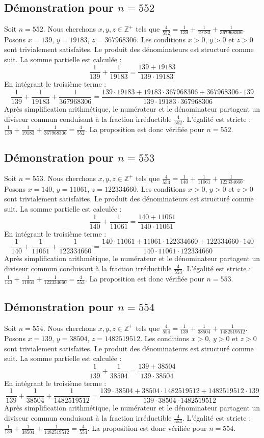 \documentclass[11pt,a4paper]{article}
\begin{document}
\subsection{Démonstration pour $n = 552$}
Soit $n = 552$. Nous cherchons $x, y, z \in \mathbb{Z}^{+}$ tels que $\frac{4}{552} = \frac{1}{139} + \frac{1}{19183} + \frac{1}{367968306}$.
Posons $x = 139$, $y = 19183$, $z = 367968306$.
Les conditions $x > 0$, $y > 0$ et $z > 0$ sont trivialement satisfaites.
Le produit des dénominateurs est structuré comme suit. La somme partielle est calculée :
$$ \frac{1}{139} + \frac{1}{19183} = \frac{139+19183}{139 \cdot 19183} $$
En intégrant le troisième terme :
$$ \frac{1}{139} + \frac{1}{19183} + \frac{1}{367968306} = \frac{139 \cdot 19183 + 19183 \cdot 367968306 + 367968306 \cdot 139}{139 \cdot 19183 \cdot 367968306} $$
Après simplification arithmétique, le numérateur et le dénominateur partagent un diviseur commun conduisant à la fraction irréductible $\frac{4}{552}$.
L'égalité est stricte : $\frac{1}{139} + \frac{1}{19183} + \frac{1}{367968306} = \frac{4}{552}$.
La proposition est donc vérifiée pour $n = 552$.
\subsection{Démonstration pour $n = 553$}
Soit $n = 553$. Nous cherchons $x, y, z \in \mathbb{Z}^{+}$ tels que $\frac{4}{553} = \frac{1}{140} + \frac{1}{11061} + \frac{1}{122334660}$.
Posons $x = 140$, $y = 11061$, $z = 122334660$.
Les conditions $x > 0$, $y > 0$ et $z > 0$ sont trivialement satisfaites.
Le produit des dénominateurs est structuré comme suit. La somme partielle est calculée :
$$ \frac{1}{140} + \frac{1}{11061} = \frac{140+11061}{140 \cdot 11061} $$
En intégrant le troisième terme :
$$ \frac{1}{140} + \frac{1}{11061} + \frac{1}{122334660} = \frac{140 \cdot 11061 + 11061 \cdot 122334660 + 122334660 \cdot 140}{140 \cdot 11061 \cdot 122334660} $$
Après simplification arithmétique, le numérateur et le dénominateur partagent un diviseur commun conduisant à la fraction irréductible $\frac{4}{553}$.
L'égalité est stricte : $\frac{1}{140} + \frac{1}{11061} + \frac{1}{122334660} = \frac{4}{553}$.
La proposition est donc vérifiée pour $n = 553$.
\subsection{Démonstration pour $n = 554$}
Soit $n = 554$. Nous cherchons $x, y, z \in \mathbb{Z}^{+}$ tels que $\frac{4}{554} = \frac{1}{139} + \frac{1}{38504} + \frac{1}{1482519512}$.
Posons $x = 139$, $y = 38504$, $z = 1482519512$.
Les conditions $x > 0$, $y > 0$ et $z > 0$ sont trivialement satisfaites.
Le produit des dénominateurs est structuré comme suit. La somme partielle est calculée :
$$ \frac{1}{139} + \frac{1}{38504} = \frac{139+38504}{139 \cdot 38504} $$
En intégrant le troisième terme :
$$ \frac{1}{139} + \frac{1}{38504} + \frac{1}{1482519512} = \frac{139 \cdot 38504 + 38504 \cdot 1482519512 + 1482519512 \cdot 139}{139 \cdot 38504 \cdot 1482519512} $$
Après simplification arithmétique, le numérateur et le dénominateur partagent un diviseur commun conduisant à la fraction irréductible $\frac{4}{554}$.
L'égalité est stricte : $\frac{1}{139} + \frac{1}{38504} + \frac{1}{1482519512} = \frac{4}{554}$.
La proposition est donc vérifiée pour $n = 554$.
\end{document}
